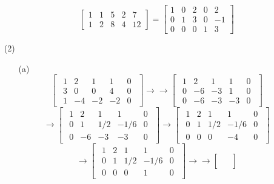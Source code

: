 \begin{itemize}
\begin{itemize}
$$\begin{bmatrix}
1 & 1 & 5 & 2 & 7 \\
1 & 2 & 8 & 4 & 12
\end{bmatrix} = \begin{bmatrix}
1 & 0 & 2 & 0 & 2 \\
0 & 1 & 3 & 0 & -1 \\
0 & 0 & 0 & 1 & 3
\end{bmatrix}$$
\end{itemize}
\item[(2)]
\begin{itemize}
\item[(a)]
$$\begin{bmatrix}
\begin{array}{cccc|c}
1 & 2 & 1 & 1 & 0 \\
3 & 0 & 0 & 4 & 0 \\
1 & -4 & -2 & -2 & 0
\end{array}
\end{bmatrix} \rightarrow\rightarrow \begin{bmatrix}
\begin{array}{cccc|c}
1 & 2 & 1 & 1 & 0 \\
0 & -6 & -3 & 1 & 0 \\
0 & -6 & -3 & -3 & 0
\end{array}
\end{bmatrix}$$
$$ \rightarrow \begin{bmatrix}
\begin{array}{cccc|c}
1 & 2 & 1 & 1 & 0 \\
0 & 1 & 1/2 & -1/6 & 0 \\
0 & -6 & -3 & -3 & 0
\end{array}
\end{bmatrix} \rightarrow \begin{bmatrix}
\begin{array}{cccc|c}
1 & 2 & 1 & 1 & 0 \\
0 & 1 & 1/2 & -1/6 & 0 \\
0 & 0 & 0 & -4 & 0
\end{array}
\end{bmatrix}$$
$$\rightarrow \begin{bmatrix}
\begin{array}{cccc|c}
1 & 2 & 1 & 1 & 0 \\
0 & 1 & 1/2 & -1/6 & 0 \\
0 & 0 & 0 & 1 & 0
\end{array}
\end{bmatrix}\rightarrow\rightarrow \begin{bmatrix}
\begin{array}{cccc|c}

\end{array}
\end{bmatrix}$$
\end{itemize}
\end{itemize}
